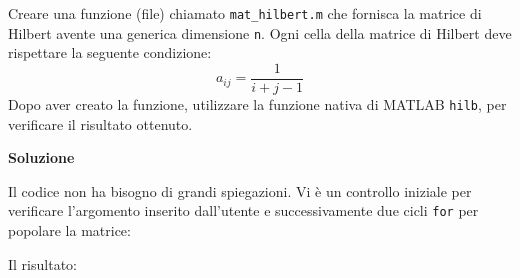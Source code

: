 Creare una funzione (file) chiamato \texttt{mat\_hilbert.m} che fornisca la matrice di Hilbert avente una generica dimensione \texttt{n}. Ogni cella della matrice di Hilbert deve rispettare la seguente condizione:
\begin{equation*}
    a_{ij} = \dfrac{1}{i + j - 1}
\end{equation*}
Dopo aver creato la funzione, utilizzare la funzione nativa di MATLAB \texttt{hilb}, per verificare il risultato ottenuto.

\begin{flushleft}
    \textcolor{Green4}{\textbf{Soluzione}}
\end{flushleft}
Il codice non ha bisogno di grandi spiegazioni. Vi è un controllo iniziale per verificare l'argomento inserito dall'utente e successivamente due cicli \texttt{for} per popolare la matrice:

Il risultato:
    